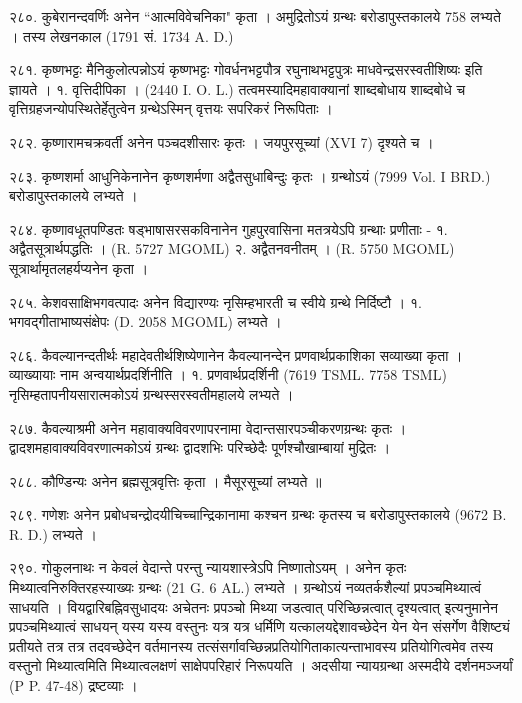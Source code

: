 २८०. कुबेरानन्दवर्णिः 
अनेन ``आत्मविवेचनिका" कृता । अमुद्रितोऽयं ग्रन्थः बरोडापुस्तकालये 758 लभ्यते । तस्य लेखनकाल (1791 सं. 1734 A. D.)

२८१. कृष्णभट्टः
मैनिकुलोत्पन्नोऽयं कृष्णभट्टः गोवर्धनभट्टपौत्र रघुनाथभट्टपुत्रः माधवेन्द्रसरस्वतीशिष्यः इति ज्ञायते ।
१. वृत्तिदीपिका । (2440 I. O. L.) तत्वमस्यादिमहावाक्यानां शाब्दबोधाय शाब्दबोधे च वृत्तिग्रहजन्योपस्थितेर्हेतुत्वेन ग्रन्थेऽस्मिन् वृत्तयः सपरिकरं निरूपिताः ।

२८२. कृष्णारामचक्रवर्ती
अनेन पञ्चदशीसारः कृतः । जयपुरसूच्यां (XVI 7) दृश्यते च ।

२८३. कृष्णशर्मा 
आधुनिकेनानेन कृष्णशर्मणा अद्वैतसुधाबिन्दुः कृतः । ग्रन्थोऽयं (7999 Vol. I BRD.) बरोडापुस्तकालये लभ्यते ।

२८४. कृष्णावधूतपण्डितः
षड्भाषासरसकविनानेन गुहपुरवासिना मतत्रयेऽपि ग्रन्थाः प्रणीताः -
१. अद्वैतसूत्रार्थपद्धतिः । (R. 5727 MGOML)
२. अद्वैतनवनीतम् । (R. 5750 MGOML) सूत्रार्थामृतलहर्यप्यनेन कृता ।

२८५. केशवसाक्षिभगवत्पादः 
अनेन विद्यारण्यः नृसिम्हभारती च स्वीये ग्रन्थे निर्दिष्टौ ।
१. भगवद्गीताभाष्यसंक्षेपः (D. 2058 MGOML) लभ्यते ।

२८६. कैवल्यानन्दतीर्थः
महादेवतीर्थशिष्येणानेन कैवल्यानन्देन प्रणवार्थप्रकाशिका सव्याख्या कृता । व्याख्यायाः नाम अन्वयार्थप्रदर्शिनीति ।
१. प्रणवार्थप्रदर्शिनी (7619 TSML. 7758 TSML) नृसिम्हतापनीयसारात्मकोऽयं ग्रन्थस्सरस्वतीमहालये लभ्यते ।

२८७. कैवल्याश्रमी 
अनेन महावाक्यविवरणापरनामा वेदान्तसारपञ्चीकरणग्रन्थः कृतः । द्वादशमहावाक्यविवरणात्मकोऽयं ग्रन्थः द्वादशभिः परिच्छेदैः पूर्णश्चौखाम्बायां मुद्रितः ।

२८८. कौण्डिन्यः 
अनेन ब्रह्मसूत्रवृत्तिः कृता । मैसूरसूच्यां लभ्यते ॥

२८९. गणेशः
अनेन प्रबोधचन्द्रोदयीचिच्चान्द्रिकानामा कश्चन ग्रन्थः कृतस्य च बरोडापुस्तकालये (9672 B. R. D.) लभ्यते ।

२९०. गोकुलनाथः
न केवलं वेदान्ते परन्तु न्यायशास्त्रेऽपि निष्णातोऽयम् । अनेन कृतः मिथ्यात्वनिरुक्तिरहस्याख्यः ग्रन्थः (21 G. 6 AL.) लभ्यते । ग्रन्थोऽयं नव्यतर्कशैल्यां प्रपञ्चमिथ्यात्वं साधयति । वियद्वारिबह्निवसुधादयः अचेतनः प्रपञ्चो मिथ्या जडत्वात् परिच्छिन्नत्वात् दृश्यत्वात् इत्यनुमानेन प्रपञ्चमिथ्यात्वं साधयन् यस्य यस्य वस्तुनः यत्र यत्र धर्मिणि यत्कालयद्देशावच्छेदेन येन येन संसर्गेण वैशिष्ट्यं प्रतीयते तत्र तत्र तदवच्छेदेन वर्तमानस्य तत्संसर्गावच्छिन्नप्रतियोगिताकात्यन्ताभावस्य प्रतियोगित्वमेव तस्य वस्तुनो मिथ्यात्वमिति मिथ्यात्वलक्षणं साक्षेपपरिहारं निरूपयति । अदसीया न्यायग्रन्था अस्मदीये दर्शनमञ्जर्यां (P P. 47-48) द्रष्टव्याः ।

